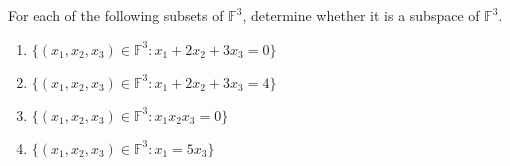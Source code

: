 \documentclass{zupan}
\begin{document}
\begin{problem}{1}
  For each of the following subsets of $\mathbb{F}^3$, determine whether it is
  a subspace of $\mathbb{F}^3$.

  \begin{enumerate}[label=(\alph*), noitemsep]
    \item $\{(x_1, x_2, x_3) \in \mathbb{F}^3 : x_1 + 2x_2 + 3x_3 = 0\}$
    \item $\{(x_1, x_2, x_3) \in \mathbb{F}^3 : x_1 + 2x_2 + 3x_3 = 4\}$
    \item $\{(x_1, x_2, x_3) \in \mathbb{F}^3 : x_1x_2x_3 = 0\}$
    \item $\{(x_1, x_2, x_3) \in \mathbb{F}^3 : x_1 = 5x_3\}$
  \end{enumerate}
\end{problem}
\end{document}
